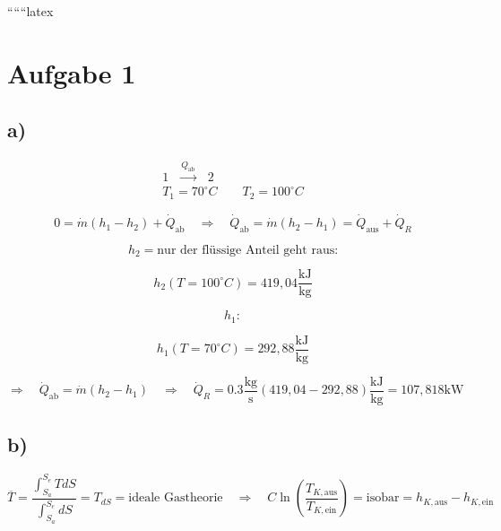 
``````latex


\section*{Aufgabe 1}

\subsection*{a)}

\begin{equation*}
\begin{array}{c}
\text{1} \quad \xrightarrow{Q_{\text{ab}}} \quad \text{2} \\
T_1 = 70^\circ C \quad \quad T_2 = 100^\circ C
\end{array}
\end{equation*}

\begin{equation*}
0 = \dot{m}(h_1 - h_2) + \dot{Q}_{\text{ab}} \quad \Rightarrow \quad \dot{Q}_{\text{ab}} = \dot{m}(h_2 - h_1) = \dot{Q}_{\text{aus}} + \dot{Q}_R
\end{equation*}

\begin{equation*}
h_2 = \text{nur der flüssige Anteil geht raus:}
\end{equation*}

\begin{equation*}
h_2(T = 100^\circ C) = 419,04 \frac{\text{kJ}}{\text{kg}}
\end{equation*}

\begin{equation*}
h_1:
\end{equation*}

\begin{equation*}
h_1(T = 70^\circ C) = 292,88 \frac{\text{kJ}}{\text{kg}}
\end{equation*}

\begin{equation*}
\Rightarrow \quad \dot{Q}_{\text{ab}} = \dot{m}(h_2 - h_1) \quad \Rightarrow \quad \dot{Q}_R = 0.3 \frac{\text{kg}}{\text{s}} (419,04 - 292,88) \frac{\text{kJ}}{\text{kg}} = 107,818 \text{kW}
\end{equation*}

\subsection*{b)}

\begin{equation*}
\overline{T} = \frac{\int_{S_a}^{S_e} T dS}{\int_{S_a}^{S_e} dS} = T_{dS} = \text{ideale Gastheorie} \quad \Rightarrow \quad C \ln \left( \frac{T_{K, \text{aus}}}{T_{K, \text{ein}}} \right) = \text{isobar} = h_{K, \text{aus}} - h_{K, \text{ein}}
\end{equation*}

